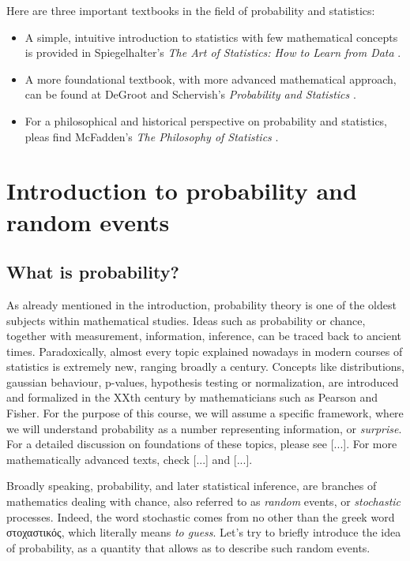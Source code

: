 \documentclass{book}
\begin{document}
Here are three important textbooks in the field of probability and statistics:
\begin{itemize}
\item A simple, intuitive introduction to statistics with few mathematical concepts is provided in Spiegelhalter's \textit{The Art of Statistics: How to Learn from Data} \cite{spiegelhalter2019art}. 
\item A more foundational textbook, with more advanced mathematical approach, can be found at DeGroot and Schervish's \textit{Probability and Statistics} \cite{degroot2012probability}.   
\item For a philosophical and historical perspective on probability and statistics, pleas find McFadden's \textit{The Philosophy of Statistics} \cite{mcfadden2011philosophy}.
\end{itemize}

\chapter{Introduction to probability and random events}

\section{What is probability?}
As already mentioned in the introduction, probability theory is one of the oldest subjects within mathematical studies. Ideas such as probability or chance, together with measurement, information, inference, can be traced back to ancient times. Paradoxically, almost every topic explained nowadays in modern courses of statistics is extremely new, ranging broadly a century. Concepts like distributions, gaussian behaviour, p-values, hypothesis testing or normalization, are introduced and formalized in the XXth century by mathematicians such as Pearson and Fisher. For the purpose of this course, we will assume a specific framework, where we will understand probability as a number representing information, or \textit{surprise}. For a detailed discussion on foundations of these topics, please see [...]. For more mathematically advanced texts, check [...]  and [...].

Broadly speaking, probability, and later statistical inference, are branches of mathematics dealing with chance, also referred to as \textit{random} events, or \textit{stochastic} processes. Indeed, the word stochastic comes from no other than the greek word \textgreek{στοχαστικός}, which literally means \textit{to guess}. Let's try to briefly introduce the idea of probability, as a quantity that allows as to describe such random events.\\
\end{document}
